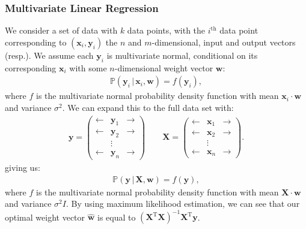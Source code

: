 \newpage

\subsubsection{Multivariate Linear Regression}

We consider a set of data with $k$ data points, with
the $i^{\text{th}}$ data point corresponding to 
$(\mathbf{x}_i,\mathbf{y}_i)$ the $n$ and $m$-dimensional,
input and output vectors (resp.). We assume each $\mathbf{y}_i$
is multivariate normal, conditional on its corresponding 
$\mathbf{x}_i$ with some $n$-dimensional weight vector 
$\mathbf{w}$: \begin{gather*}
    \mathbb{P}(\mathbf{y}_i \, | \, \mathbf{x}_i, \mathbf{w})
    = f(\mathbf{y}_i),
\end{gather*} where $f$ is the multivariate normal probability
density function with mean $\mathbf{x}_i \cdot \mathbf{w}$ and
variance $\sigma^2$. We can expand this to the full data set 
with: \begin{gather*}
    \mathbf{y} = \begin{pmatrix}
        \leftarrow & \mathbf{y}_1 & \rightarrow \\
        \leftarrow & \mathbf{y}_2 & \rightarrow \\
                   & \vdots &          \\
        \leftarrow & \mathbf{y}_n & \rightarrow
    \end{pmatrix}
    \qquad
    \mathbf{X} = \begin{pmatrix}
        \leftarrow & \mathbf{x}_1 & \rightarrow \\
        \leftarrow & \mathbf{x}_2 & \rightarrow \\
                   & \vdots &                   \\
        \leftarrow & \mathbf{x}_n & \rightarrow
    \end{pmatrix}.
\end{gather*} 
giving us: \begin{gather} \label{multivarlinreg}
    \mathbb{P}(\mathbf{y} \, | \, \mathbf{X}, \mathbf{w}) 
    = f(\mathbf{y}),
\end{gather} where $f$ is the multivariate normal probability
density function with mean $\mathbf{X} \cdot \mathbf{w}$ and
variance $\sigma^2 I$. By using maximum likelihood estimation,
we can see that our optimal weight vector $\mathbf{\hat{w}}$
is equal to $(\mathbf{X}^{\text{T}}\mathbf{X})^{-1}
\mathbf{X}^{\text{T}}\mathbf{y}$.


